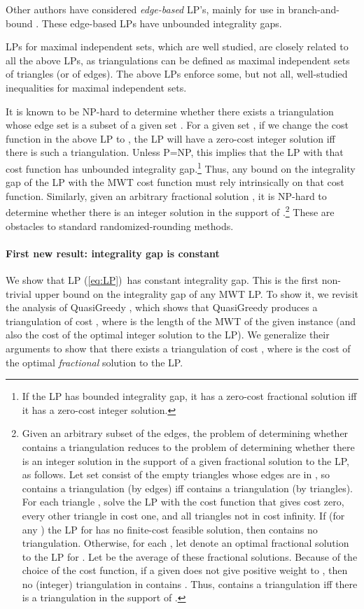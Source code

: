 \documentclass[final]{siamltex}
\newcommand{\refLP}{(\ref{eq:LP})\xspace}
\begin{document}
Other authors have considered {\em edge-based} LP's, mainly for use in branch-and-bound
\cite{kyoda1996study,kyoda1997branch,ono1996package,tajima1998optimality,aurenhammer2000optimal}.
These edge-based LPs have unbounded integrality gaps.

LPs for maximal independent sets, which are well studied, are closely related to all the above LPs,
as triangulations can be defined as maximal independent sets of triangles (or of edges).
The above LPs enforce some, but not all, well-studied inequalities for maximal independent sets.

It is known to be NP-hard to determine whether there exists a triangulation
whose edge set is a subset of a given set 
\cite{lloyd77triangulations}.
For a given set , if we change the cost function in the above LP to
,
the LP will have a zero-cost integer solution iff there is such a triangulation.
Unless P=NP, this implies that the LP with that cost function has unbounded integrality gap.\footnote
{If the LP has bounded integrality gap,  it has a zero-cost fractional solution iff it has a zero-cost integer solution.}
Thus, any bound on the integrality gap of the LP 
with the MWT cost function must rely intrinsically on that cost function.
Similarly,  given an arbitrary fractional solution , it is NP-hard to determine whether there is an integer solution in the support of .\footnote
{Given an arbitrary subset  of the edges, the problem of determining whether 
contains a triangulation reduces to the problem of determining whether there is an integer solution in the support of a given fractional solution to the LP, as follows.  
Let set  consist of the empty triangles whose edges are in ,
so  contains a triangulation (by edges) 
iff  contains a triangulation (by triangles).
For each triangle , solve the LP with the cost function
that gives  cost zero, every other triangle in  cost one,
and all triangles not in  cost infinity.  
If (for any ) the LP for  has no finite-cost feasible solution,
then  contains no triangulation.  Otherwise, for each ,
let  denote an optimal fractional solution to the LP for .  
Let  be the average of these fractional solutions.
Because of the choice of the cost function, if a given  does not give positive weight to , then no (integer) triangulation in  contains .  Thus,  contains a triangulation iff there is a triangulation in the support of .}
These are obstacles to standard randomized-rounding methods.



\paragraph{First new result: integrality gap is constant}
We show that LP \refLP\ has constant integrality gap.  
This is the first non-trivial upper bound on the integrality gap of any MWT LP.
To show it, we revisit the analysis of {\sc QuasiGreedy} \cite{krznaric1998quasi},
which shows that {\sc QuasiGreedy} produces a triangulation
of cost , where  is the length of the MWT 
of the given instance 
(and also the cost of the optimal integer solution to the LP).
We generalize their arguments to show that there exists a triangulation
of cost , where  is the cost of the optimal
{\em fractional} solution to the LP.
\end{document}
